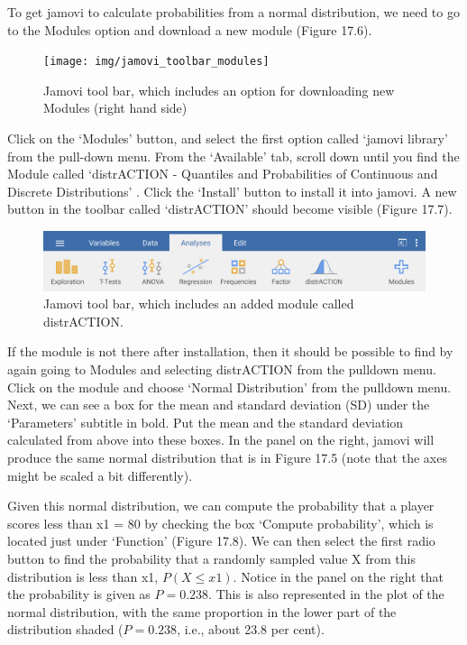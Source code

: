 \documentclass[
]{scrbook}
\begin{document}
To get jamovi to calculate probabilities from a normal distribution, we need to go to the Modules option and download a new module (Figure 17.6).

\begin{figure}
\texttt{[image: img/jamovi\_toolbar\_modules]} \caption{Jamovi tool bar, which includes an option for downloading new Modules (right hand side)}\label{fig:unnamed-chunk-75}
\end{figure}

Click on the `Modules' button, and select the first option called `jamovi library' from the pull-down menu.
From the `Available' tab, scroll down until you find the Module called `distrACTION - Quantiles and Probabilities of Continuous and Discrete Distributions' \citep{Rihs2018}.
Click the `Install' button to install it into jamovi.
A new button in the toolbar called `distrACTION' should become visible (Figure 17.7).

\begin{figure}
\includegraphics[width=1\linewidth]{img/jamovi_toolbar_modules_distrACTION} \caption{Jamovi tool bar, which includes an added module called distrACTION.}\label{fig:unnamed-chunk-76}
\end{figure}

If the module is not there after installation, then it should be possible to find by again going to Modules and selecting distrACTION from the pulldown menu.
Click on the module and choose `Normal Distribution' from the pulldown menu.
Next, we can see a box for the mean and standard deviation (SD) under the `Parameters' subtitle in bold.
Put the mean and the standard deviation calculated from above into these boxes.
In the panel on the right, jamovi will produce the same normal distribution that is in Figure 17.5 (note that the axes might be scaled a bit differently).

Given this normal distribution, we can compute the probability that a player scores less than x1 = 80 by checking the box `Compute probability', which is located just under `Function' (Figure 17.8).
We can then select the first radio button to find the probability that a randomly sampled value X from this distribution is less than x1, \(P(X \leq x1)\).
Notice in the panel on the right that the probability is given as \(P = 0.238\).
This is also represented in the plot of the normal distribution, with the same proportion in the lower part of the distribution shaded (\(P = 0.238\), i.e., about 23.8 per cent).
\end{document}
